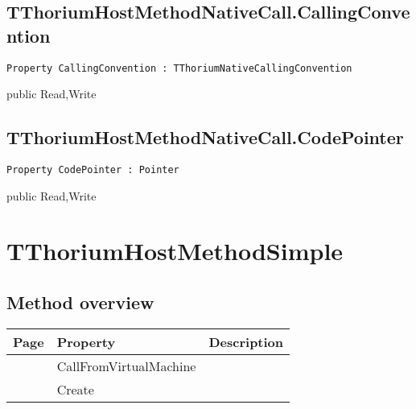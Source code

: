 \subsection{TThoriumHostMethodNativeCall.CallingConvention}
\label{thoriumcore:thorium:tthoriumhostmethodnativecall:callingconvention}
\begin{FPCList}
\Synopsis
\Declaration 

\begin{verbatim}
Property CallingConvention : TThoriumNativeCallingConvention
\end{verbatim}
\Visibility
public
\Access
Read,Write
\Description
\end{FPCList}
\subsection{TThoriumHostMethodNativeCall.CodePointer}
\label{thoriumcore:thorium:tthoriumhostmethodnativecall:codepointer}
\begin{FPCList}
\Synopsis
\Declaration 

\begin{verbatim}
Property CodePointer : Pointer
\end{verbatim}
\Visibility
public
\Access
Read,Write
\Description
\end{FPCList}
\section{TThoriumHostMethodSimple}
\label{thoriumcore:thorium:tthoriumhostmethodsimple}
\subsection{Method overview}
\label{thoriumcore:thorium:tthoriumhostmethodsimple:methods}
\begin{tabularx}{\textwidth}{llX}
Page & Property & Description  \\ \hline
\pageref{thoriumcore:thorium:tthoriumhostmethodsimple:callfromvirtualmachine} & CallFromVirtualMachine  &  \\
\pageref{thoriumcore:thorium:tthoriumhostmethodsimple:create} & Create  &  \\
\hline
\end{tabularx}
